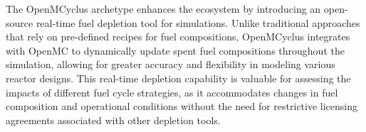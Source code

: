 The OpenMCyclus archetype \cite{openmcyclus_paper} enhances the \cyclus
ecosystem by introducing an open-source real-time fuel depletion tool for
\cyclus simulations. Unlike traditional approaches that rely on pre-defined
recipes for fuel compositions, OpenMCyclus integrates with OpenMC
\cite{romano_openmc_2015} to dynamically update spent fuel compositions
throughout the simulation, allowing for greater accuracy and flexibility in
modeling various reactor designs. This real-time depletion capability is
valuable for assessing the impacts of different fuel cycle strategies, as it
accommodates changes in fuel composition and operational conditions without the
need for restrictive licensing agreements associated with other depletion tools.


